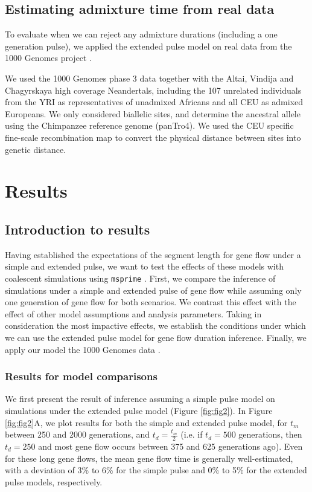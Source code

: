 \documentclass[]{article}
\begin{document}
\subsection{Estimating admixture time from real data}\label{Estimating admixture time from real data}
To evaluate when we can reject any admixture durations (including a one generation pulse), we applied the extended pulse model on real data from the 1000 Genomes project \cite{the_1000_genomes_project_consortium_global_2015}.

We used the 1000 Genomes phase 3 data together with the Altai, Vindija and Chagyrskaya high coverage Neandertals, including the 107 unrelated individuals from the YRI as representatives of unadmixed Africans and all CEU as admixed Europeans. We only considered biallelic sites, and determine the ancestral allele using  the Chimpanzee reference genome (panTro4). We used the CEU specific fine-scale recombination map \citep{spence_inference_2019} to convert the physical distance between sites into genetic distance. 


\section{Results}\label{results}

\subsection{Introduction to results}\label{introduction to result}



Having established the expectations of the segment length for gene flow under a simple and extended pulse, we want to test the effects of these models with coalescent simulations using \texttt{msprime} \citep{kelleher_efficient_2016}. First, we compare the inference of simulations under a simple and extended pulse of gene flow while assuming only one generation of gene flow for both scenarios. We contrast this effect with the effect of other model assumptions and analysis parameters. Taking in consideration the most impactive effects, we establish the conditions under which we can use the extended pulse model for gene flow duration inference. Finally, we apply our model the 1000 Genomes data \citep{the_1000_genomes_project_consortium_global_2015}.



\subsubsection{Results for model comparisons}
We first present the result of inference assuming a simple pulse model on simulations under the extended pulse model (Figure \ref{fig:fig2}).
In Figure \ref{fig:fig2}A, we plot results for both the simple and extended pulse model, for $t_m$ between 250 and 2000 generations, and $t_d = \frac{t_m}{2}$  (i.e. if $t_d= 500$ generations, then $t_d = 250$ and most gene flow occurs between  375 and 625
generations ago). Even for these long gene flows, the mean gene flow time is generally well-estimated, with a deviation of 3\% to 6\% for the simple pulse and 0\% to 5\% for
the extended pulse models, respectively.
\end{document}
